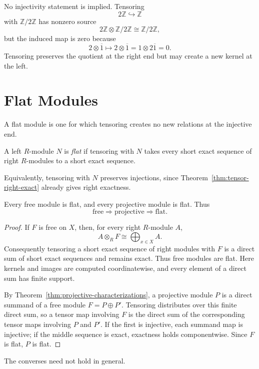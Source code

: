 No injectivity statement is implied. Tensoring
\[
2\mathbb Z\hookrightarrow\mathbb Z
\]
with \(\mathbb Z/2\mathbb Z\) has nonzero source
\[
2\mathbb Z\otimes\mathbb Z/2\mathbb Z\cong\mathbb Z/2\mathbb Z,
\]
but the induced map is zero because
\[
2\otimes\overline1\longmapsto2\otimes\overline1
=1\otimes2\overline1=0.
\]
Tensoring preserves the quotient at the right end but may create a new
kernel at the left.

\section{Flat Modules}
A flat module is one for which tensoring creates no new relations at the
injective end.
\begin{definition}
A left \(R\)-module \(N\) is \emph{flat} if tensoring with \(N\) takes every
short exact sequence of right \(R\)-modules to a short exact sequence.
\end{definition}
Equivalently, tensoring with \(N\) preserves injections, since
Theorem~\ref{thm:tensor-right-exact} already gives right exactness.

\begin{proposition}\label{prop:projective-flat}
Every free module is flat, and every projective module is flat.  Thus
\[
\text{free}\Longrightarrow\text{projective}\Longrightarrow\text{flat}.
\]
\end{proposition}
\begin{proof}
If \(F\) is free on \(X\), then, for every right \(R\)-module \(A\),
\[
A\otimes_R F\cong\bigoplus_{x\in X}A.
\]
Consequently tensoring a short exact sequence of right modules with \(F\) is a direct sum of
short exact sequences and remains exact.  Thus free modules are flat.
Here kernels and images are computed coordinatewise, and every element of a
direct sum has finite support.

By Theorem~\ref{thm:projective-characterizations}, a projective module \(P\)
is a direct summand of a free module \(F=P\oplus P'\).  Tensoring distributes
over this finite direct sum, so a tensor map involving \(F\) is the direct
sum of the corresponding tensor maps involving \(P\) and \(P'\).  If the
first is injective, each summand map is injective; if the middle sequence is
exact, exactness holds componentwise.  Since \(F\) is flat, \(P\) is flat.
\end{proof}
The converses need not hold in general.



